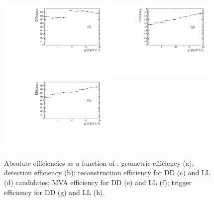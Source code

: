 \begin{figure}
\includegraphics[width=0.48\textwidth]{Lmumu/figs/efficiencies/BR/effvsq2_LL_mva.pdf}
\includegraphics[width=0.48\textwidth]{Lmumu/figs/efficiencies/BR/effvsq2_DD_trig.pdf}
\includegraphics[width=0.48\textwidth]{Lmumu/figs/efficiencies/BR/effvsq2_LL_trig.pdf}
\caption{Absolute efficiencies as a function of \qsq: geometric efficiency (a); 
detection efficiency (b); reconstruction efficiency for DD (c) and LL (d) candidates; 
MVA efficiency for DD (e) and LL (f); trigger efficiency for DD (g) and LL (h).}
\label{fig:Lb_absEff}
\end{figure}

\clearpage
